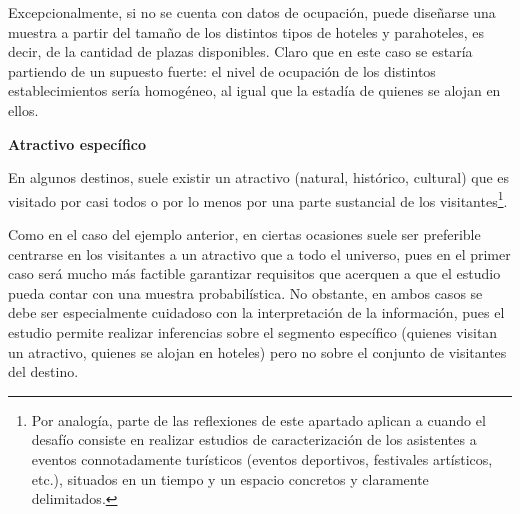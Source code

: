 \documentclass[
]{book}
\begin{document}
Excepcionalmente, si no se cuenta con datos de ocupación, puede diseñarse una muestra a partir del tamaño de los distintos tipos de hoteles y parahoteles, es decir, de la cantidad de plazas disponibles. Claro que en este caso se estaría partiendo de un supuesto fuerte: el nivel de ocupación de los distintos establecimientos sería homogéneo, al igual que la estadía de quienes se alojan en ellos.

\hfill\break

\textbf{Atractivo específico}

En algunos destinos, suele existir un atractivo (natural, histórico, cultural) que es visitado por casi todos o por lo menos por una parte sustancial de los visitantes\footnote{Por analogía, parte de las reflexiones de este apartado aplican a cuando el desafío consiste en realizar estudios de caracterización de los asistentes a eventos connotadamente turísticos (eventos deportivos, festivales artísticos, etc.), situados en un tiempo y un espacio concretos y claramente delimitados.}.

Como en el caso del ejemplo anterior, en ciertas ocasiones suele ser preferible centrarse en los visitantes a un atractivo que a todo el universo, pues en el primer caso será mucho más factible garantizar requisitos que acerquen a que el estudio pueda contar con una muestra probabilística. No obstante, en ambos casos se debe ser especialmente cuidadoso con la interpretación de la información, pues el estudio permite realizar inferencias sobre el segmento específico (quienes visitan un atractivo, quienes se alojan en hoteles) pero no sobre el conjunto de visitantes del destino.
\end{document}

